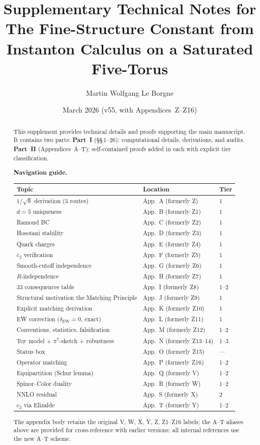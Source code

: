\documentclass[11pt,a4paper]{article}
\title{\vspace{-1em}\textbf{Supplementary Technical Notes for}\\[0.25em]
\textbf{The Fine-Structure Constant from Instanton Calculus on a Saturated Five-Torus}}
\author{Martin Wolfgang Le Borgne}
\date{March 2026 (v55, with Appendices~Z--Z16)}
\begin{document}
\maketitle
\thispagestyle{fancy}

\begin{abstract}
This supplement provides technical details and proofs supporting the
main manuscript.  It contains two parts:
\textbf{Part~I} (\S\S\,1--26): computational details, derivations,
and audits.
\textbf{Part~II} (Appendices~A--T): self-contained proofs added in
each with explicit tier classification.

\medskip\noindent
\textbf{Navigation guide.}
\begin{center}\small
\renewcommand{\arraystretch}{1.1}
\begin{tabular}{lll}
\toprule
\textbf{Topic} & \textbf{Location} & \textbf{Tier}\\
\midrule
$1/\!\sqrt{8}$ derivation (3 routes) & App.~A (formerly Z) & 1\\
$d=5$ uniqueness & App.~B (formerly Z1) & 1\\
Ramond BC & App.~C (formerly Z2) & 1\\
Hosotani stability & App.~D (formerly Z3) & 1\\
Quark charges & App.~E (formerly Z4) & 1\\
$c_2$ verification & App.~F (formerly Z5) & 1\\
Smooth-cutoff independence & App.~G (formerly Z6) & 1\\
$R$-independence & App.~H (formerly Z7) & 1\\
33 consequences table & App.~I (formerly Z8) & 1--2\\
Structural motivation the Matching Principle & App.~J (formerly Z9) & 1\\
Explicit matching derivation & App.~K (formerly Z10) & 1\\
EW correction ($\delta_{\mathrm{EW}}=0$, exact) & App.~L (formerly Z11) & 1\\
Conventions, statistics, falsification & App.~M (formerly Z12) & 1--2\\
Toy model + $\pi^7$-sketch + robustness & App.~N (formerly Z13--14) & 1--3\\
Status box & App.~O (formerly Z15) & ---\\
Operator matching & App.~P (formerly Z16) & 1--2\\
\midrule
Equipartition (Schur lemma) & App.~Q (formerly V) & 1--2\\
Spinor--Color duality & App.~R (formerly W) & 1--2\\
NNLO residual & App.~S (formerly X) & 2\\
$c_2$ via Elizalde & App.~T (formerly Y) & 1--2\\
\bottomrule
\end{tabular}
\end{center}
The appendix body retains the original V, W, X, Y, Z, Z1--Z16 labels; the A--T aliases above are provided for cross-reference with earlier
versions; all internal references use the new A--T scheme.
\end{abstract}
\end{document}
